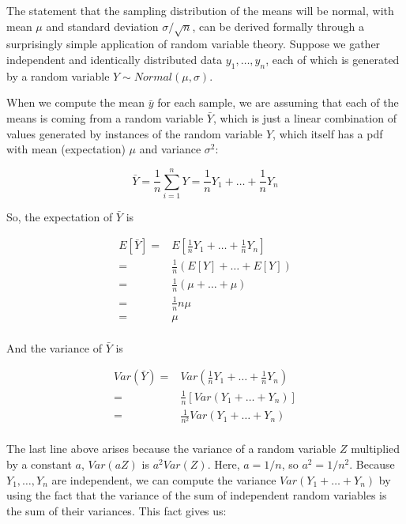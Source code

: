 \documentclass[12pt,]{krantz}
\begin{document}
The statement that the sampling distribution of the means will be normal, with mean \(\mu\) and standard deviation \(\sigma/\sqrt{n}\), can be derived formally through a surprisingly simple application of random variable theory. Suppose we gather independent and identically distributed data \(y_1, \dots, y_n\), each of which is generated by a random variable \(Y\sim Normal(\mu,\sigma)\).

When we compute the mean \(\bar{y}\) for each sample, we are assuming that each of the means is coming from a random variable \(\bar{Y}\), which is just a linear combination of values generated by instances of the random variable \(Y\), which itself has a pdf with mean (expectation) \(\mu\) and variance \(\sigma^2\):

\begin{equation}
\bar{Y}=\frac{1}{n} \sum_{i=1}^n Y = \frac{1}{n}Y_1 + \dots + \frac{1}{n}Y_n
 \end{equation}

So, the expectation of \(\bar{Y}\) is

\begin{equation}
\begin{split}
E[\bar{Y}] =& E[\frac{1}{n}Y_1 + \dots + \frac{1}{n}Y_n]\\
=& \frac{1}{n} (E[Y] + \dots + E[Y])\\
=& \frac{1}{n} (\mu + \dots + \mu)\\
=& \frac{1}{n} n\mu \\
=& \mu \\
\end{split}
\end{equation}

And the variance of \(\bar{Y}\) is

\begin{equation}
\begin{split}
Var(\bar{Y}) =& Var(\frac{1}{n}Y_1 + \dots + \frac{1}{n}
Y_n)\\
=& \frac{1}{n} [Var(Y_1 + \dots + Y_n)]\\
=& \frac{1}{n^2} Var(Y_1 + \dots + Y_n)\\
\end{split}
\end{equation}

The last line above arises because the variance of a random variable \(Z\) multiplied by a constant \(a\), \(Var(aZ)\) is \(a^2 Var(Z)\). Here, \(a=1/n\), so \(a^2 = 1/n^2\).
Because \(Y_1,\dots,Y_n\) are independent, we can compute the variance \(Var(Y_1 + \dots + Y_n)\) by using the fact that the variance of the sum of independent random variables is the sum of their variances. This fact gives us:
\end{document}
